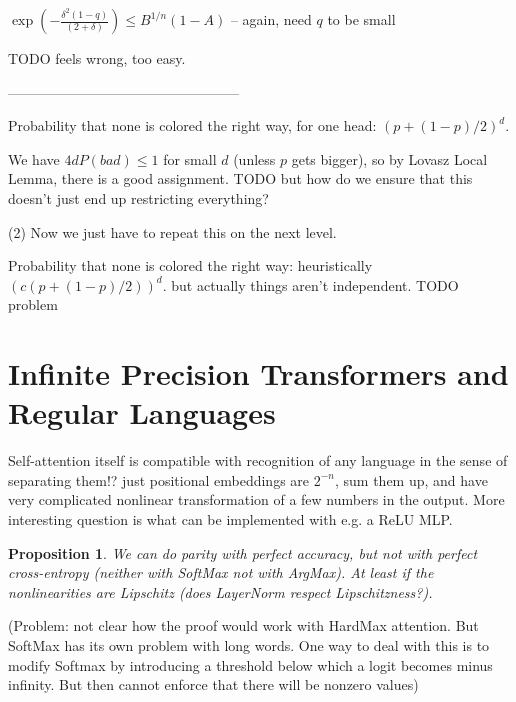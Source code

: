\documentclass[11pt,a4paper]{article}
\newcounter{theorem}
\newtheorem{proposition}[theorem]{Proposition}
\begin{document}
$ \exp(-\frac{\delta^2(1-q)}{(2+\delta)})  \leq B^{1/n} (1-A)$ -- again, need $q$ to be small

TODO feels wrong, too easy.

--------------------------------------------------

Probability that none is colored the right way, for one head: $(p+(1-p)/2)^d$.

We have $4d P(bad) \leq 1$ for small $d$ (unless $p$ gets bigger), so by Lovasz Local Lemma, there is a good assignment. TODO but how do we ensure that this doesn't just end up restricting everything?

(2) Now we just have to repeat this on the next level.

Probability that none is colored the right way: heuristically $(c(p+(1-p)/2))^d$. but actually things aren't independent. TODO problem


\section{Infinite Precision Transformers and Regular Languages}

Self-attention itself is compatible with recognition of any language in the sense of separating them!? just positional embeddings are $2^{-n}$, sum them up, and have very complicated nonlinear transformation of a few numbers in the output.
More interesting question is what can be implemented with e.g. a ReLU MLP.

\begin{proposition}
We can do parity with perfect accuracy, but not with perfect cross-entropy (neither with SoftMax not with ArgMax). At least if the nonlinearities are Lipschitz (does LayerNorm respect Lipschitzness?).
\end{proposition}


(Problem: not clear how the proof would work with HardMax attention. But SoftMax has its own problem with long words. One way to deal with this is to modify Softmax by introducing a threshold below which a logit becomes minus infinity. But then cannot enforce that there will be nonzero values)
\end{document}
